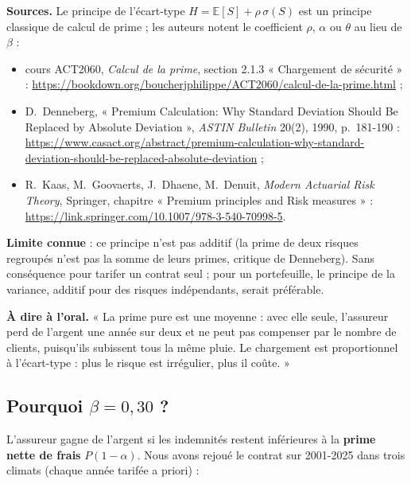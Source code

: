 \documentclass[11pt,a4paper]{article}
\begin{document}
\textbf{Sources.} Le principe de l'écart-type $H = \mathbb{E}[S] + \rho\,\sigma(S)$ est un principe classique de calcul de
prime ; les auteurs notent le coefficient $\rho$, $\alpha$ ou $\theta$ au lieu de $\beta$ :
\begin{itemize}
  \item cours ACT2060, \emph{Calcul de la prime}, section 2.1.3 « Chargement de sécurité » :
        \url{https://bookdown.org/boucherjphilippe/ACT2060/calcul-de-la-prime.html} ;
  \item D.~Denneberg, « Premium Calculation: Why Standard Deviation Should Be Replaced by Absolute Deviation »,
        \emph{ASTIN Bulletin} 20(2), 1990, p.~181-190 :
        \url{https://www.casact.org/abstract/premium-calculation-why-standard-deviation-should-be-replaced-absolute-deviation} ;
  \item R.~Kaas, M.~Goovaerts, J.~Dhaene, M.~Denuit, \emph{Modern Actuarial Risk Theory}, Springer, chapitre
        « Premium principles and Risk measures » : \url{https://link.springer.com/10.1007/978-3-540-70998-5}.
\end{itemize}
\textbf{Limite connue} : ce principe n'est pas additif (la prime de deux risques regroupés n'est pas la somme de leurs
primes, critique de Denneberg). Sans conséquence pour tarifer un contrat seul ; pour un portefeuille, le principe de la
variance, additif pour des risques indépendants, serait préférable.

\begin{encadre}
\textbf{À dire à l'oral.} « La prime pure est une moyenne : avec elle seule, l'assureur perd de l'argent une année sur
deux et ne peut pas compenser par le nombre de clients, puisqu'ils subissent tous la même pluie. Le chargement est
proportionnel à l'écart-type : plus le risque est irrégulier, plus il coûte. »
\end{encadre}

\subsection{Pourquoi \texorpdfstring{$\beta = 0{,}30$}{beta = 0,30} ?}
L'assureur gagne de l'argent si les indemnités restent inférieures à la \textbf{prime nette de frais} $P(1-\alpha)$.
Nous avons rejoué le contrat sur 2001-2025 dans trois climats (chaque année tarifée a priori) :
\end{document}
